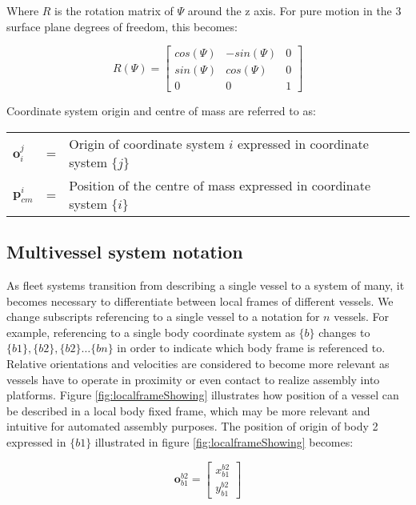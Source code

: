 Where $R$ is the rotation matrix of $\Psi$ around the z axis. For pure motion in the 3 surface plane degrees of freedom, this becomes:

\begin{equation}
R(\Psi) = \begin{bmatrix} cos(\Psi) & -sin(\Psi) & 0  \\ sin(\Psi) & cos(\Psi) & 0 \\ 0 & 0 & 1 \end{bmatrix}
\end{equation}

Coordinate system origin and centre of mass are referred to as:

\begin{table}[H]
	\centering
	\begin{tabular}{lll}
		$\textbf{o}_{i}^{j} $ 			& = &  	Origin of coordinate system $i$ expressed in coordinate system $\{j\}$ \\[10pt]
		$\textbf{p}_{cm}^{i} $ 			& = &  	Position of the centre of mass expressed in coordinate system $\{i\}$ \\
	\end{tabular}
\end{table}


\subsection{Multivessel system notation}
As fleet systems transition from describing a single vessel to a system of many, it becomes necessary to differentiate between local frames of different vessels. We change subscripts referencing to a single vessel to a notation for $n$ vessels. For example, referencing to a single body coordinate system as $\{b\}$ changes to $\{b1\},\{b2\},\{b2\} \dots \{bn\}$ in order to indicate which body frame is referenced to. Relative orientations and velocities are considered to become more relevant as vessels have to operate in proximity or even contact to realize assembly into platforms. Figure \ref{fig:localframeShowing} illustrates how position of a vessel can be described in a local body fixed frame, which may be more relevant and intuitive for automated assembly purposes. The position of origin of body 2 expressed in $\{b1\}$ illustrated in figure \ref{fig:localframeShowing} becomes:

\begin{equation}
\textbf{o}_{b1}^{b2} = \begin{bmatrix}x_{b1}^{b2} \\[10pt] y_{b1}^{b2} \end{bmatrix}
\end{equation}

